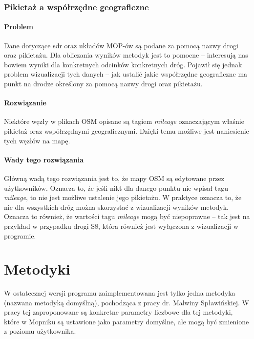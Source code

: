 \subsubsection{Pikietaż a współrzędne geograficzne}
\paragraph{Problem} Dane dotyczące \acrshort{sdr} oraz układów MOP-ów są podane
za pomocą nazwy drogi oraz pikietażu. Dla obliczania wyników metodyk jest to
pomocne -- interesują nas bowiem wyniki dla konkretnych odcinków konkretnych
dróg. Pojawił się jednak problem wizualizacji tych danych -- jak ustalić jakie
współrzędne geograficzne ma punkt na drodze określony za pomocą nazwy drogi
oraz pikietażu.
\paragraph{Rozwiązanie} Niektóre węzły w plikach OSM opisane są tagiem \textit{mileage} oznaczającym
właśnie pikietaż oraz współrzędnymi geograficznymi. Dzięki temu możliwe jest
naniesienie tych węzłów na mapę.
\paragraph{Wady tego rozwiązania}
Główną wadą tego rozwiązania jest to, że mapy OSM są edytowane przez
użytkowników. Oznacza to, że jeśli nikt dla danego punktu nie wpisał tagu
\textit{mileage}, to nie jest możliwe ustalenie jego pikietażu. W
praktyce oznacza to, że nie dla wszystkich dróg można skorzystać z wizualizacji
wyników metodyk. Oznacza to również, że wartości tagu \textit{mileage} mogą być
niepoprawne -- tak jest na przykład w przypadku drogi S8, która również jest
wyłączona z wizualizacji w programie.


\section{Metodyki}
\paragraph{}
W ostatecznej wersji programu zaimplementowana jest tylko jedna metodyka
(nazwana metodyką domyślną),
pochodząca z pracy dr. Malwiny Spławińskiej\cite{metodyki}.
W pracy tej zaproponowane są konkretne parametry liczbowe dla tej metodyki,
które w Mopniku są ustawione jako parametry domyślne, ale mogą być zmienione
z poziomu użytkownika.
